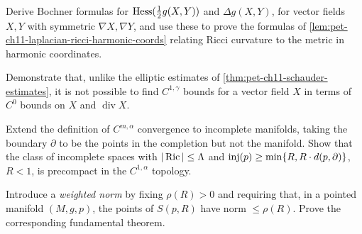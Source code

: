 \begin{remark}
  \label{rem:pet-ch11-exercise-11-6-5}

  Derive Bochner formulas for $\operatorname{Hess}(\tfrac12g(X,Y))$ and
  $\Delta g(X,Y)$, for vector fields $X,Y$ with symmetric $\nabla X,\nabla Y$,
  and use these to prove the formulas of
  \cref{lem:pet-ch11-laplacian-ricci-harmonic-coords} relating Ricci
  curvature to the metric in harmonic coordinates.
\end{remark}

\begin{remark}
  \label{rem:pet-ch11-exercise-11-6-6}

  Demonstrate that, unlike the elliptic estimates of
  \cref{thm:pet-ch11-schauder-estimates}, it is not possible to find
  $C^{1,\gamma}$ bounds for a vector field $X$ in terms of $C^0$ bounds on
  $X$ and $\operatorname{div}X$.
\end{remark}

\begin{remark}
  \label{rem:pet-ch11-exercise-11-6-7}

  Extend the definition of $C^{m,\alpha}$ convergence to incomplete manifolds,
  taking the boundary $\partial$ to be the points in the completion but not
  the manifold.
  Show that the class of incomplete spaces with $|\operatorname{Ric}|\le\Lambda$ and
  $\operatorname{inj}(p)\ge\min\{R,R\cdot d(p,\partial)\}$, $R<1$, is precompact in the
  $C^{1,\alpha}$ topology.
\end{remark}

\begin{remark}
  \label{rem:pet-ch11-exercise-11-6-8}

  Introduce a \emph{weighted norm} by fixing $\rho(R)>0$ and requiring that, in a
  pointed manifold $(M,g,p)$, the points of $S(p,R)$ have norm $\le\rho(R)$.
  Prove the corresponding fundamental theorem.
\end{remark}

